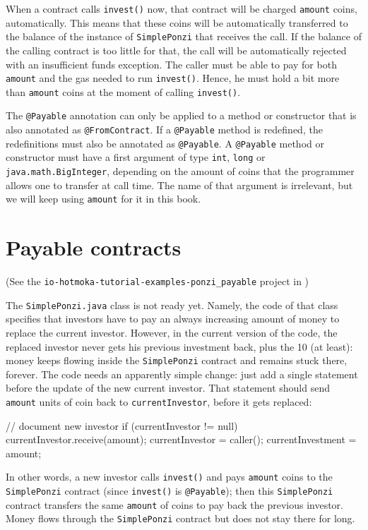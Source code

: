 %
When a contract calls \texttt{invest()} now, that contract will be charged
\texttt{amount} coins,
automatically. This means that these coins will be automatically transferred to the
balance of the instance of \texttt{SimplePonzi} that receives the call.
If the balance of the calling contract is too little for that, the call
will be automatically rejected with an insufficient funds exception. The caller
must be able to pay for both \texttt{amount} and the gas needed to run \texttt{invest()}. Hence,
he must hold a bit more than \texttt{amount} coins at the moment of calling \texttt{invest()}.

\begin{commentbox}
The \texttt{@Payable} annotation can only be applied to a method or constructor that
is also annotated as \texttt{@FromContract}. If a \texttt{@Payable} method is redefined,
the redefinitions
must also be annotated as \texttt{@Payable}. A \texttt{@Payable} method or constructor
must have a first argument of type \texttt{int}, \texttt{long} or \texttt{java.math.BigInteger},
depending on the amount of coins that the programmer allows one to transfer
at call time. The name of that argument is irrelevant, but we will keep
using \texttt{amount} for it in this book.
\end{commentbox}

\section{Payable contracts}\label{sec:payable_contracts}

\begin{center}
(See the \texttt{io-hotmoka-tutorial-examples-ponzi\_payable} project in \hotmokaRepo{})
\end{center}

The \texttt{SimplePonzi.java} class is not ready yet. Namely, the code
of that class specifies that investors have to pay
an always increasing amount of money to replace the current investor.
However, in the current version of the code,
the replaced investor never gets his previous investment back, plus the 10%
(at least): money keeps flowing inside the \texttt{SimplePonzi} contract and remains
stuck there, forever. The code needs an apparently simple change: just add a single statement
before the update of the new current investor. That statement should send
\texttt{amount} units of coin back to \texttt{currentInvestor}, before it gets replaced:
%
\begin{codebox}\begin{javalst}
// document new investor
if (currentInvestor != null)
  currentInvestor.receive(amount);
currentInvestor = caller();
currentInvestment = amount;
\end{javalst}\end{codebox}
%
In other words, a new investor calls \texttt{invest()} and pays \texttt{amount} coins to
the \texttt{SimplePonzi} contract (since \texttt{invest()} is \texttt{@Payable}); then
this \texttt{SimplePonzi} contract transfers the same \texttt{amount} of coins to pay back the
previous investor. Money flows through the \texttt{SimplePonzi} contract but
does not stay there for long.

